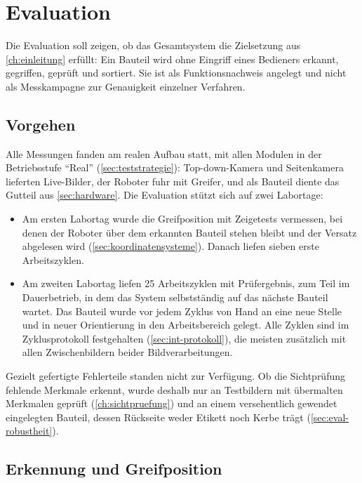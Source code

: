 \chapter{Evaluation}
\label{ch:evaluation}

Die Evaluation soll zeigen, ob das Gesamtsystem die Zielsetzung aus \cref{ch:einleitung}
erfüllt: Ein Bauteil wird ohne Eingriff eines Bedieners erkannt, gegriffen, geprüft und
sortiert. Sie ist als Funktionsnachweis angelegt und nicht als Messkampagne zur Genauigkeit
einzelner Verfahren.

\section{Vorgehen}
\label{sec:eval-vorgehen}

Alle Messungen fanden am realen Aufbau statt, mit allen Modulen in der Betriebsstufe
\enquote{Real} (\cref{sec:teststrategie}): Top-down-Kamera und Seitenkamera lieferten Live-Bilder,
der Roboter fuhr mit Greifer, und als Bauteil diente das Gutteil aus \cref{sec:hardware}. Die
Evaluation stützt sich auf zwei Labortage:
\begin{itemize}
  \item Am ersten Labortag wurde die Greifposition mit Zeigetests vermessen, bei denen der
        Roboter über dem erkannten Bauteil stehen bleibt und der Versatz abgelesen wird
        (\cref{sec:koordinatensysteme}). Danach liefen sieben erste Arbeitszyklen.
  \item Am zweiten Labortag liefen 25 Arbeitszyklen mit Prüfergebnis, zum Teil im
        Dauerbetrieb, in dem das System selbstständig auf das nächste Bauteil wartet. Das
        Bauteil wurde vor jedem Zyklus von Hand an eine neue Stelle und in neuer Orientierung in
        den Arbeitsbereich gelegt. Alle Zyklen sind im Zyklusprotokoll festgehalten
        (\cref{sec:int-protokoll}), die meisten zusätzlich mit allen Zwischenbildern beider
        Bildverarbeitungen.
\end{itemize}
Gezielt gefertigte Fehlerteile standen nicht zur Verfügung. Ob die Sichtprüfung fehlende
Merkmale erkennt, wurde deshalb nur an Testbildern mit übermalten Merkmalen geprüft
(\cref{ch:sichtpruefung}) und an einem versehentlich gewendet eingelegten Bauteil, dessen
Rückseite weder Etikett noch Kerbe trägt (\cref{sec:eval-robustheit}).

\section{Erkennung und Greifposition}
\label{sec:eval-greifposition}


